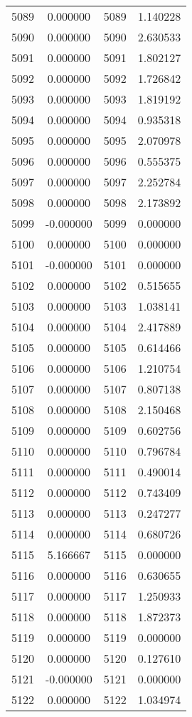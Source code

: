 \documentclass[12pt]{article}
\begin{document}
\begin{longtable}{@{}cccc@{}}
5089 & 0.000000 & 5089 & 1.140228 \\
5090 & 0.000000 & 5090 & 2.630533 \\
5091 & 0.000000 & 5091 & 1.802127 \\
5092 & 0.000000 & 5092 & 1.726842 \\
5093 & 0.000000 & 5093 & 1.819192 \\
5094 & 0.000000 & 5094 & 0.935318 \\
5095 & 0.000000 & 5095 & 2.070978 \\
5096 & 0.000000 & 5096 & 0.555375 \\
5097 & 0.000000 & 5097 & 2.252784 \\
5098 & 0.000000 & 5098 & 2.173892 \\
5099 & -0.000000 & 5099 & 0.000000 \\
5100 & 0.000000 & 5100 & 0.000000 \\
5101 & -0.000000 & 5101 & 0.000000 \\
5102 & 0.000000 & 5102 & 0.515655 \\
5103 & 0.000000 & 5103 & 1.038141 \\
5104 & 0.000000 & 5104 & 2.417889 \\
5105 & 0.000000 & 5105 & 0.614466 \\
5106 & 0.000000 & 5106 & 1.210754 \\
5107 & 0.000000 & 5107 & 0.807138 \\
5108 & 0.000000 & 5108 & 2.150468 \\
5109 & 0.000000 & 5109 & 0.602756 \\
5110 & 0.000000 & 5110 & 0.796784 \\
5111 & 0.000000 & 5111 & 0.490014 \\
5112 & 0.000000 & 5112 & 0.743409 \\
5113 & 0.000000 & 5113 & 0.247277 \\
5114 & 0.000000 & 5114 & 0.680726 \\
5115 & 5.166667 & 5115 & 0.000000 \\
5116 & 0.000000 & 5116 & 0.630655 \\
5117 & 0.000000 & 5117 & 1.250933 \\
5118 & 0.000000 & 5118 & 1.872373 \\
5119 & 0.000000 & 5119 & 0.000000 \\
5120 & 0.000000 & 5120 & 0.127610 \\
5121 & -0.000000 & 5121 & 0.000000 \\
5122 & 0.000000 & 5122 & 1.034974 \\

\end{longtable}
\end{document}
